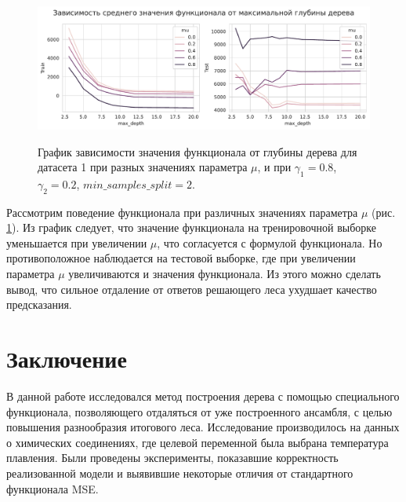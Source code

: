 \documentclass{article}
\begin{document}
\begin{figure}[h]
	\begin{center}
		\begin{minipage}[h]{1.0\linewidth}
			{\includegraphics[width=1.0\linewidth]{../figures/max_depth_task1_gamma_08_min_2.pdf}}	
		\end{minipage}
	\end{center}
	
	\caption{График зависимости значения функционала от глубины дерева для датасета 1 при разных значениях параметра $\mu$, и при $\gamma_1 = 0.8$, $\gamma_2 = 0.2$, $min\_samples\_split = 2$. }
	\label{ris:image7}
\end{figure}

Рассмотрим поведение функционала при различных значениях параметра $\mu$ (рис. \ref{ris:image7}). Из график следует, что значение функционала на тренировочной выборке уменьшается при увеличении $\mu$, что согласуется с формулой функционала. Но противоположное наблюдается на тестовой выборке, где при увеличении параметра $\mu$ увеличиваются и значения функционала. Из этого можно сделать вывод, что сильное отдаление от ответов решающего леса ухудшает качество предсказания.


\newpage

\section{Заключение}

В данной работе исследовался метод построения дерева с помощью специального функционала, позволяющего отдаляться от уже построенного ансамбля, с целью повышения разнообразия итогового леса. Исследование производилось на данных о химических соединениях, где целевой переменной была выбрана температура плавления.
Были проведены эксперименты, показавшие корректность реализованной модели и выявившие некоторые отличия от стандартного функционала MSE.



\end{document}
